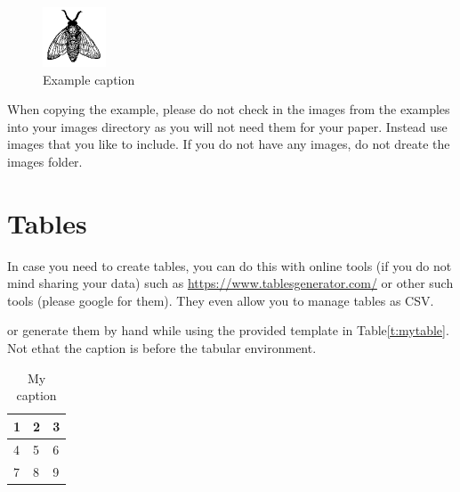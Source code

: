 \documentclass[sigconf]{acmart}
\begin{document}
\begin{figure}[!ht]
  \centering\includegraphics[width=\columnwidth]{images/fly.pdf}
  \caption{Example caption}\label{f:fly}
\end{figure}

When copying the example, please do not check in the images from the
examples into your images directory as you will not need them for your
paper. Instead use images that you like to include. If you do not have
any images, do not dreate the images folder.

\section{Tables}

In case you need to create tables, you can do this with online tools
(if you do not mind sharing your data) such as
\url{https://www.tablesgenerator.com/} or other such tools (please
google for them). They even allow you to manage tables as CSV.

or generate them by hand while using the provided template in Table\ref{t:mytable}. Not ethat
the caption is before the tabular environment.

\begin{table}[htb]
\centering
\caption{My caption}
\label{t:mytabble}
\begin{tabular}{lll}
1 & 2 & 3 \\
\hline
4 & 5 & 6 \\
7 & 8 & 9
\end{tabular}
\end{table}
\end{document}
